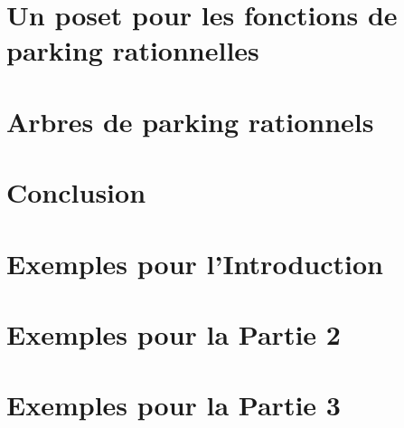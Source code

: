 \documentclass[11pt]{article}
\theoremstyle{remark}
\theoremstyle{definition}
\begin{document}
\section{Un poset pour les fonctions de parking rationnelles}


\newpage
\section{Arbres de parking rationnels}


\section{Conclusion}



\newpage


\appendix

\newpage
\section{Exemples pour l'Introduction}


\section{Exemples pour la Partie 2}


\section{Exemples pour la Partie 3}

\end{document}
